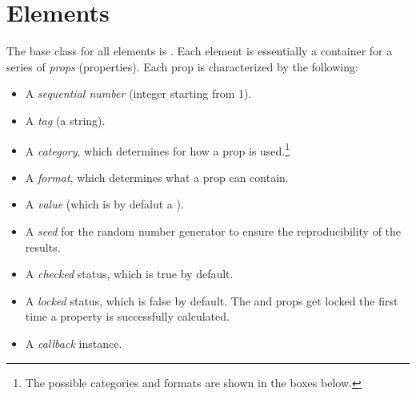 \documentclass{tufte-handout}
\begin{document}
\section{Elements}

The base class for all elements is . 
Each element is essentially a container for a series of \emph{props} (properties). Each prop is characterized by the following:
\begin{itemize}
	\item A \emph{sequential number} (integer starting from 1).
	
	\item A \emph{tag} (a string).
	
	\item A \emph{category}, which determines for how a prop is used.\footnote{The possible categories and formats are shown in the boxes below.}
	
	\item A \emph{format}, which determines what a prop can contain.
	
	\item A \emph{value} (which is by defalut a ).
	
	\item A \emph{seed} for the random number generator to ensure the reproducibility of the results.
	
	\item A \emph{checked} status, which is true by default.
	
	\item A \emph{locked} status, which is false by default. The  and  props get locked the first time a  property is successfully calculated.
	
	\item A \emph{callback} instance.
\end{itemize}
\end{document}

